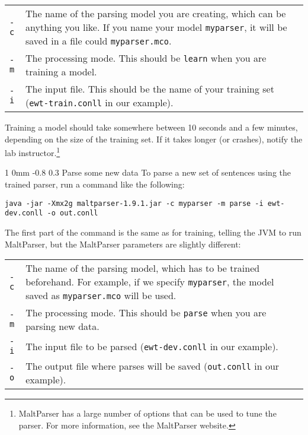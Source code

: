 \documentclass[10.9pt]{article}
\makeatletter
\newcommand{\newsec}[2]{\section{#1}\label{sec:#2}\noindent}
\renewcommand{\section}{\@startsection
{section}%
{1}%
{0mm}%
{-0.8\baselineskip}%
{0.3\baselineskip}%
{\bfseries\large}}%
\makeatother
\begin{document}
\vspace{0.2cm}
\noindent
\begin{tabular}{lp{15.5cm}}
{\tt -c} &The name of the parsing model you are creating, which can be anything you like. If you name your model {\tt myparser}, it will be saved in a file could {\tt myparser.mco}.\\
{\tt -m} &The processing mode. This should be {\tt learn} when you are training a model.\\
{\tt -i} &The input file. This should be the name of your training set ({\tt ewt-train.conll} in our example).\\
\end{tabular}

\vspace{0.2cm}
\noindent
Training a model should take somewhere between 10 seconds and a few
minutes, depending on the size of the training set. If it takes longer
(or crashes), notify the lab instructor.\footnote{%
  MaltParser has a large number of options that can be used to tune
  the parser. For more information, see the MaltParser website.}

\newsec{Parse some new data}{parse}%
To parse a new set of sentences using the trained parser, run a
command like the following:
\begin{footnotesize}
\begin{verbatim}
java -jar -Xmx2g maltparser-1.9.1.jar -c myparser -m parse -i ewt-dev.conll -o out.conll
\end{verbatim}
\end{footnotesize} 
The first part of the command is the same as for training, telling the
JVM to run MaltParser, but the MaltParser parameters are slightly
different:

\vspace{0.2cm}
\noindent
\begin{tabular}{lp{15cm}} {\tt -c} &The name of the parsing model,
  which has to be trained beforehand.
  For example, if we specify {\tt myparser}, the model saved as {\tt myparser.mco} will be used. \\
  {\tt -m} &The processing mode. This should be {\tt parse} when you are parsing new data. \\
  {\tt -i}	 &The input file to be parsed ({\tt ewt-dev.conll} in our example).\\
  {\tt -o} &The output file where parses will be saved
  ({\tt out.conll} in our example).\\
\end{tabular}
\end{document}
